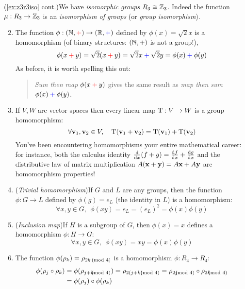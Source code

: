 \begin{examples}{}{}
	\exstart (\ref{ex:z3r3iso} cont.)\quad 	We have \emph{isomorphic groups} $R_3\cong\Z_3$. Indeed the function $\mu:R_3\to\Z_3$ is an \emph{isomorphism of groups} (or \emph{group isomorphism}).
	
	\begin{enumerate}\setcounter{enumi}{1}
	  \item The%
		\def\opbl{\mathbin{\textcolor{blue}{+}}}
		\def\oprd{\mathbin{\textcolor{red}{+}}} 
		function $\phi:(\N,\textcolor{red}{+})\to(\R,\textcolor{blue}{+})$ defined by $\phi(x)=\sqrt 2x$ is a homomorphism (of binary structures: $(\N,+)$ is not a group!),
		\[
			\phi(x\oprd y)=\sqrt 2(x\oprd y)=\sqrt 2x\opbl \sqrt 2y=\phi(x)\opbl \phi(y)
		\]
		As before, it is worth spelling this out:
		\begin{quote}
	  	\emph{Sum then map} $\phi(x\oprd y)$ gives the same result as \emph{map then sum} $\phi(x)\opbl\phi(y)$.
		\end{quote}
		
		
		\goodbreak
		
		
	  \item If $V,W$ are vector spaces then every linear map $\rT:V\to W$ is a group homomorphism:\footnotemark
	  \[
	  	\forall\vv_1,\vv_2\in V,\quad \rT(\vv_1+\vv_2)=\rT(\vv_1)+\rT(\vv_2)
	  \]
	  You've been encountering homomorphisms your entire mathematical career: for instance, both the calculus identity $\diff x(f+g)=\diff[f]{x}+\diff[g]{x}$ and the distributive law of matrix multiplication $A(\vx+\vy)=A\vx+A\vy$ are homomorphism properties! 
	  
	  \item (\emph{Trivial homomorphism})\lstsp If $G$ and $L$ are any groups, then the function $\phi:G\to L$ defined by $\phi(g)=e_L$ (the identity in $L$) is a homomorphism:
	  \[
	  	\forall x,y\in G,\ \ \phi(xy)=e_L=(e_L)^2=\phi(x)\phi(y)
	  \]
	  
	  \item (\emph{Inclusion map})\lstsp If $H$ is a subgroup of $G$, then $\phi(x)=x$ defines a homomorphism $\phi:H\to G$:
	  \[
	  	\forall x,y\in G,\ \ \phi(xy)=xy=\phi(x)\phi(y)
	  \]
	  
	  \item\def\3nth{\negthickspace\negthickspace\negthickspace} The function $\phi(\rho_k)=\rho_{2k\negthickspace\pmod 4}$ is a homomorphism $\phi:R_4\to R_4$:
	  \begin{align*}
	  	\phi(\rho_j\circ\rho_k)&=\phi(\rho_{j+k\3nth\pmod 4}) 
	  	=\rho_{2(j+k)\3nth\pmod 4} =\rho_{2j\3nth\pmod 4}\circ \rho_{2k\3nth\pmod 4}\\
	  	&=\phi(\rho_j)\circ\phi(\rho_k)	  
	  \end{align*}
	\end{enumerate}
\end{examples}

